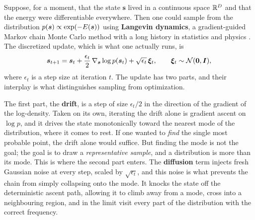 Suppose, for a moment, that the state $\bm{s}$ lived in a continuous space $\mathbb{R}^D$ and that the energy were differentiable everywhere. Then one could sample from the distribution $p(\bm{s}) \propto \exp(-E(\bm{s}))$ using \textbf{Langevin dynamics}, a gradient-guided Markov chain Monte Carlo method with a long history in statistics and physics \citep{roberts1996exponential, welling2011bayesian}. The discretized update, which is what one actually runs, is
\begin{equation}
    \bm{s}_{t+1} = \bm{s}_t + \frac{\epsilon_t}{2}\,\nabla_{\bm{s}} \log p(\bm{s}_t) + \sqrt{\epsilon_t}\,\bm{\xi}_t, \qquad \bm{\xi}_t \sim \mathcal{N}(\bm{0}, \bm{I}),
    \label{eq:bg-langevin}
\end{equation}
where $\epsilon_t$ is a step size at iteration $t$. The update has two parts, and their interplay is what distinguishes sampling from optimization.

The first part, the \textbf{drift}, is a step of size $\epsilon_t/2$ in the direction of the gradient of the log-density. Taken on its own, iterating the drift alone is gradient ascent on $\log p$, and it drives the state monotonically toward the nearest mode of the distribution, where it comes to rest. If one wanted to \emph{find} the single most probable point, the drift alone would suffice. But finding the mode is not the goal; the goal is to draw a \emph{representative sample}, and a distribution is more than its mode. This is where the second part enters. The \textbf{diffusion} term injects fresh Gaussian noise at every step, scaled by $\sqrt{\epsilon_t}$, and this noise is what prevents the chain from simply collapsing onto the mode. It knocks the state off the deterministic ascent path, allowing it to climb away from a mode, cross into a neighbouring region, and in the limit visit every part of the distribution with the correct frequency.

